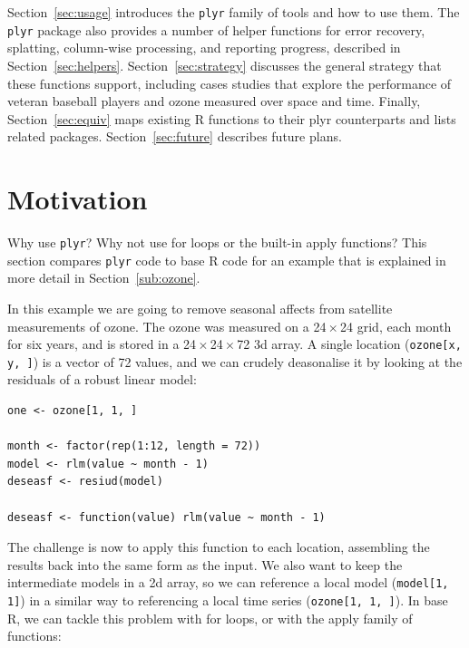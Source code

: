 \documentclass{scrartcl}
\newcommand{\code}[1]{\lstinline!#1!}
\newcommand{\plyr}{{\tt plyr}\xspace}
\newcommand{\x}{\,$\times$\,}
\begin{document}
Section~\ref{sec:usage} introduces the {\tt plyr} family of tools and how to use them.  The {\tt plyr} package also provides a number of helper functions for error recovery, splatting, column-wise processing, and reporting progress,  described in Section~\ref{sec:helpers}. Section~\ref{sec:strategy} discusses the general strategy that these functions support, including cases studies that explore the performance of veteran baseball players and ozone measured over space and time.  Finally, Section~\ref{sec:equiv} maps existing R functions to their plyr counterparts and lists related packages.  Section~\ref{sec:future} describes future plans.

\section{Motivation}
\label{sec:motivation}

Why use \plyr?  Why not use for loops or the built-in apply functions?  This section compares \plyr code to base R code for an example that is explained in more detail in Section~\ref{sub:ozone}.  

In this example we are going to remove seasonal affects from satellite measurements of ozone.  The ozone was measured on a 24\x24 grid, each month for six years, and is stored in a 24\x24\x72 3d array. A single location (\code{ozone[x, y, ]}) is a vector of 72 values, and we can crudely deasonalise it by looking at the residuals of a robust linear model:

\begin{verbatim}
one <- ozone[1, 1, ]

month <- factor(rep(1:12, length = 72))
model <- rlm(value ~ month - 1)
deseasf <- resiud(model)

deseasf <- function(value) rlm(value ~ month - 1)
\end{verbatim}

The challenge is now to apply this function to each location, assembling the results back into the same form as the input.  We also want to keep the intermediate models in a 2d array, so we can reference a local model (\code{model[1, 1]}) in a similar way to referencing a local time series (\code{ozone[1, 1, ]}).  In base R, we can tackle this problem with for loops, or with the apply family of functions:
\end{document}
